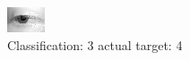 \begin{figure}[h!]
\begin{center}
\includegraphics[width=0.60\columnwidth]{figures/ID2612_class_3_target_4.png}
\end{center}
\caption{ Classification: 3 actual target: 4}
\label{fig:ID2612_class_3_target_4}
\end{figure}
